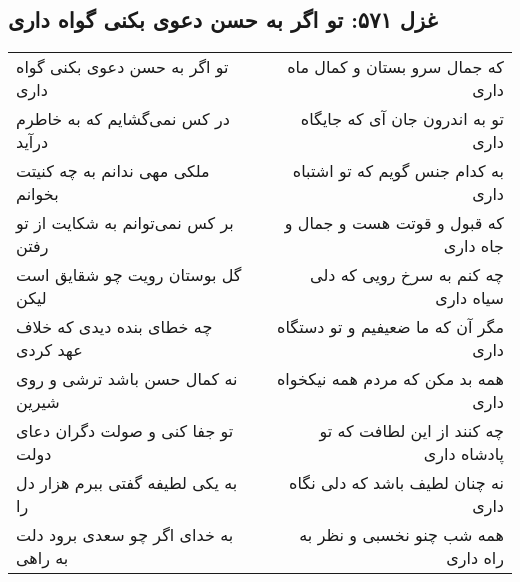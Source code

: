 \begin{center}
\section*{غزل ۵۷۱: تو اگر به حسن دعوی بکنی گواه داری}
\label{sec:571}
\begin{longtable}{l p{0.5cm} r}
تو اگر به حسن دعوی بکنی گواه داری
&&
که جمال سرو بستان و کمال ماه داری
\\
در کس نمی‌گشایم که به خاطرم درآید
&&
تو به اندرون جان آی که جایگاه داری
\\
ملکی مهی ندانم به چه کنیتت بخوانم
&&
به کدام جنس گویم که تو اشتباه داری
\\
بر کس نمی‌توانم به شکایت از تو رفتن
&&
که قبول و قوتت هست و جمال و جاه داری
\\
گل بوستان رویت چو شقایق است لیکن
&&
چه کنم به سرخ رویی که دلی سیاه داری
\\
چه خطای بنده دیدی که خلاف عهد کردی
&&
مگر آن که ما ضعیفیم و تو دستگاه داری
\\
نه کمال حسن باشد ترشی و روی شیرین
&&
همه بد مکن که مردم همه نیکخواه داری
\\
تو جفا کنی و صولت دگران دعای دولت
&&
چه کنند از این لطافت که تو پادشاه داری
\\
به یکی لطیفه گفتی ببرم هزار دل را
&&
نه چنان لطیف باشد که دلی نگاه داری
\\
به خدای اگر چو سعدی برود دلت به راهی
&&
همه شب چنو نخسبی و نظر به راه داری
\\
\end{longtable}
\end{center}
